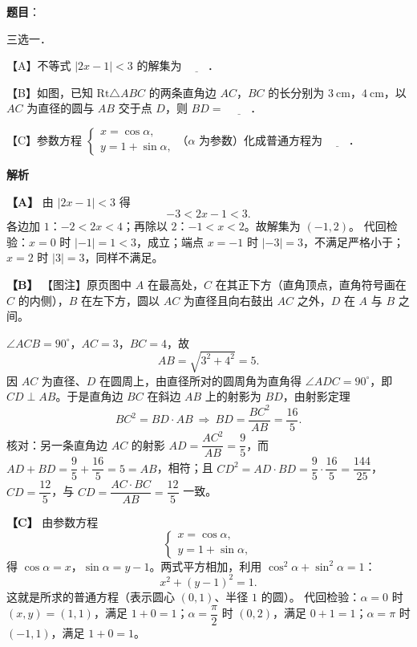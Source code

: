 \begin{answer}

\textbf{题目}：

三选一．

【A】不等式 $|2x-1|<3$ 的解集为 $\underline{\qquad}$．

【B】如图，已知 $\mathrm{Rt}\triangle ABC$ 的两条直角边 $AC$，$BC$ 的长分别为 $3\ \mathrm{cm}$，$4\ \mathrm{cm}$，以 $AC$ 为直径的圆与 $AB$ 交于点 $D$，则 $BD=$ $\underline{\qquad}$．
\nopagebreak[4]
\begin{center}\end{center}
\nopagebreak[4]
【C】参数方程 $\begin{cases}x=\cos\alpha,\\[2pt]y=1+\sin\alpha,\end{cases}$（$\alpha$ 为参数）化成普通方程为 $\underline{\qquad}$．

\textbf{解析}

\textbf{【A】} 由 $|2x-1|<3$ 得
\nopagebreak[4]
\[-3<2x-1<3.\]
各边加 $1$：$-2<2x<4$；再除以 $2$：$-1<x<2$。故解集为 $(-1,2)$。
代回检验：$x=0$ 时 $|{-1}|=1<3$，成立；端点 $x=-1$ 时 $|{-3}|=3$，不满足严格小于；$x=2$ 时 $|3|=3$，同样不满足。

\textbf{【B】} 【图注】原页图中 $A$ 在最高处，$C$ 在其正下方（直角顶点，直角符号画在 $C$ 的内侧），$B$ 在左下方，圆以 $AC$ 为直径且向右鼓出 $AC$ 之外，$D$ 在 $A$ 与 $B$ 之间。

$\angle ACB=90^\circ$，$AC=3$，$BC=4$，故
\nopagebreak[4]
\[AB=\sqrt{3^2+4^2}=5.\]
因 $AC$ 为直径、$D$ 在圆周上，由直径所对的圆周角为直角得 $\angle ADC=90^\circ$，即 $CD\perp AB$。于是直角边 $BC$ 在斜边 $AB$ 上的射影为 $BD$，由射影定理
\nopagebreak[4]
\[BC^2=BD\cdot AB\ \Longrightarrow\ BD=\frac{BC^2}{AB}=\frac{16}{5}.\]
核对：另一条直角边 $AC$ 的射影 $AD=\dfrac{AC^2}{AB}=\dfrac95$，而 $AD+BD=\dfrac95+\dfrac{16}{5}=5=AB$，相符；且 $CD^2=AD\cdot BD=\dfrac95\cdot\dfrac{16}{5}=\dfrac{144}{25}$，$CD=\dfrac{12}{5}$，与 $CD=\dfrac{AC\cdot BC}{AB}=\dfrac{12}{5}$ 一致。

\textbf{【C】} 由参数方程
\nopagebreak[4]
\[\begin{cases}x=\cos\alpha,\\ y=1+\sin\alpha,\end{cases}\]
得 $\cos\alpha=x$，$\sin\alpha=y-1$。两式平方相加，利用 $\cos^2\alpha+\sin^2\alpha=1$：
\nopagebreak[4]
\[x^2+(y-1)^2=1.\]
这就是所求的普通方程（表示圆心 $(0,1)$、半径 $1$ 的圆）。
代回检验：$\alpha=0$ 时 $(x,y)=(1,1)$，满足 $1+0=1$；$\alpha=\dfrac\pi2$ 时 $(0,2)$，满足 $0+1=1$；$\alpha=\pi$ 时 $(-1,1)$，满足 $1+0=1$。


\end{answer}

